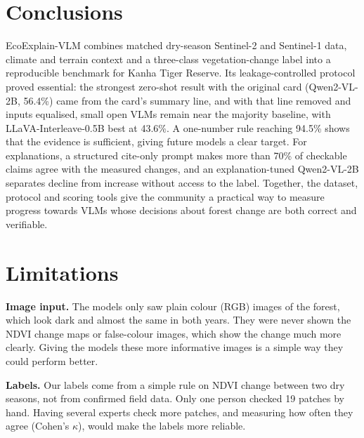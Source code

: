 \documentclass[11pt]{article}
\begin{document}

\section{Conclusions}
\label{sec:conclusions}

EcoExplain-VLM combines matched dry-season Sentinel-2 and Sentinel-1
data, climate and terrain context and a three-class vegetation-change
label into a reproducible benchmark for Kanha Tiger Reserve. Its
leakage-controlled protocol proved essential: the strongest zero-shot
result with the original card (Qwen2-VL-2B, 56.4\%) came from the card's
summary line, and with that line removed and inputs equalised, small open
VLMs remain near the majority baseline, with LLaVA-Interleave-0.5B best
at 43.6\%. A one-number rule reaching 94.5\% shows that the evidence is
sufficient, giving future models a clear target. For explanations, a
structured cite-only prompt makes more than 70\% of checkable claims
agree with the measured changes, and an explanation-tuned Qwen2-VL-2B
separates decline from increase without access to the label. Together,
the dataset, protocol and scoring tools give the community a practical
way to measure progress towards VLMs whose decisions about forest change
are both correct and verifiable.


\section*{Limitations}

\textbf{Image input.} The models only saw plain colour (RGB) images of
the forest, which look dark and almost the same in both years. They were
never shown the NDVI change maps or false-colour images, which show the
change much more clearly. Giving the models these more informative
images is a simple way they could perform better.

\textbf{Labels.} Our labels come from a simple rule on NDVI change
between two dry seasons, not from confirmed field data. Only one person
checked 19 patches by hand. Having several experts check more patches,
and measuring how often they agree (Cohen's $\kappa$), would make the labels more reliable.
\end{document}
